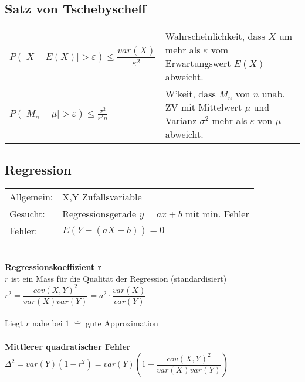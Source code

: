 \subsection{Satz von Tschebyscheff \skript{\pageref{sk-ungleichung-von-tschebyscheff}}}
\begin{tabular}{ll}
  $P(\left| X-E(X) \right|>\varepsilon)\leq\dfrac{var(X)}{\varepsilon^2}$ &
  Wahrscheinlichkeit, dass $X$ um mehr als $\varepsilon$ vom Erwartungswert $E(X)$ abweicht.\\
  $P(|M_{n}-\mu|>\varepsilon)\leq \frac{\sigma^{2}}{\varepsilon^{2}n} $ &
  W'keit, dass $M_{n}$ von $n$ unab. ZV mit Mittelwert $\mu$ und Varianz $\sigma^{2}$ mehr als $\varepsilon$ von $\mu$ abweicht.
\end{tabular}

\begin{minipage}[t]{9cm}
  \subsection{Regression \skript{\pageref{sk-rekursion}}}
  \begin{tabular}{ll}
    Allgemein: & X,Y Zufallsvariable \\
    Gesucht: & Regressionsgerade $y=ax+b$ mit min. Fehler \\
    Fehler: & $E(Y-(aX+b))=0$ \\
  \end{tabular} \\
 
  \textbf{Regressionskoeffizient r} \\
  $r$ ist ein Mass für die Qualität der Regression (standardisiert) \\
  $r^2=\dfrac{cov(X,Y)^2}{var(X)var(Y)}=a^2\cdot\dfrac{var(X)}{var(Y)}$ \\  \\
  Liegt $r$ nahe bei $1$ $\widehat{=}$ gute Approximation\\ \\
 
  \textbf{Mittlerer quadratischer Fehler} \\
  $\Delta^2 = var(Y)(1-r^2) =
  var(Y)\left(1-\dfrac{cov(X,Y)^2}{var(X)var(Y)}\right) $ \\
\end{minipage}
